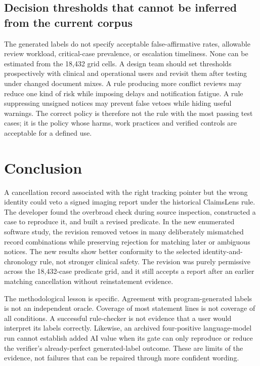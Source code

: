 \documentclass[11pt,twocolumn]{article}
\begin{document}
\subsection{Decision thresholds that cannot be inferred from the current corpus}
The generated labels do not specify acceptable false-affirmative rates, allowable review workload, critical-case prevalence, or escalation timeliness. None can be estimated from the 18,432 grid cells. A design team should set thresholds prospectively with clinical and operational users and revisit them after testing under changed document mixes. A rule producing more conflict reviews may reduce one kind of risk while imposing delays and notification fatigue. A rule suppressing unsigned notices may prevent false vetoes while hiding useful warnings. The correct policy is therefore not the rule with the most passing test cases; it is the policy whose harms, work practices and verified controls are acceptable for a defined use.

\section{Conclusion}
A cancellation record associated with the right tracking pointer but the wrong identity could veto a signed imaging report under the historical ClaimsLens rule. The developer found the overbroad check during source inspection, constructed a case to reproduce it, and built a revised predicate. In the new enumerated software study, the revision removed vetoes in many deliberately mismatched record combinations while preserving rejection for matching later or ambiguous notices. The new results show better conformity to the selected identity-and-chronology rule, not stronger clinical safety. The revision was purely permissive across the 18,432-case predicate grid, and it still accepts a report after an earlier matching cancellation without reinstatement evidence.

The methodological lesson is specific. Agreement with program-generated labels is not an independent oracle. Coverage of most statement lines is not coverage of all conditions. A successful rule-checker is not evidence that a user would interpret its labels correctly. Likewise, an archived four-positive language-model run cannot establish added AI value when its gate can only reproduce or reduce the verifier's already-perfect generated-label outcome. These are limits of the evidence, not failures that can be repaired through more confident wording.
\end{document}
